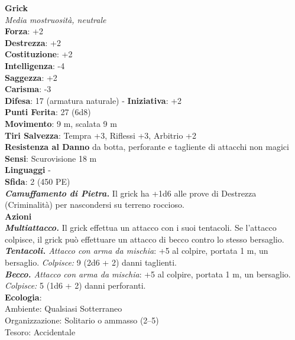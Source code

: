 \begin{multicols}{2}
\medskip\textbf{Grick}\\
\emph{Media mostruosità, neutrale}\\
\textbf{Forza}: +2\\
\textbf{Destrezza}: +2\\
\textbf{Costituzione}: +2\\
\textbf{Intelligenza}: -4\\
\textbf{Saggezza}: +2\\
\textbf{Carisma}: -3\\
\textbf{Difesa}: 17 (armatura naturale) - \textbf{Iniziativa}: +2\\
\textbf{Punti Ferita}: 27 (6d8)\\
\textbf{Movimento}: 9 m, scalata 9 m\\
\textbf{Tiri Salvezza}: Tempra +3, Riflessi +3, Arbitrio +2\\
\textbf{Resistenza al Danno} da botta, perforante e tagliente di attacchi non magici\\
\textbf{Sensi}: Scurovisione 18 m\\
\textbf{Linguaggi} -\\
\textbf{Sfida}: 2 (450 PE)\smallskip\\
\emph{\textbf{Camuffamento di Pietra.}} Il grick ha +1d6 alle prove di Destrezza (Criminalità) per nascondersi su terreno roccioso.\\
\smallskip\textbf{Azioni}\\
\emph{\textbf{Multiattacco.}} Il grick effettua un attacco con i suoi tentacoli. Se l'attacco colpisce, il grick può effettuare un attacco di becco contro lo stesso bersaglio.\\
\emph{\textbf{Tentacoli.} Attacco con arma da mischia}: +5 al colpire, portata 1 m, un bersaglio.
\emph{Colpisce:} 9 (2d6 + 2) danni taglienti.\\
\emph{\textbf{Becco.} Attacco con arma da mischia}: +5 al colpire, portata 1 m, un bersaglio.
\emph{Colpisce:} 5 (1d6 + 2) danni perforanti.\\
\textbf{Ecologia}: \\
Ambiente: Qualsiasi Sotterraneo\\
Organizzazione: Solitario o ammasso (2–5)\\
Tesoro: Accidentale\\


\end{multicols}
